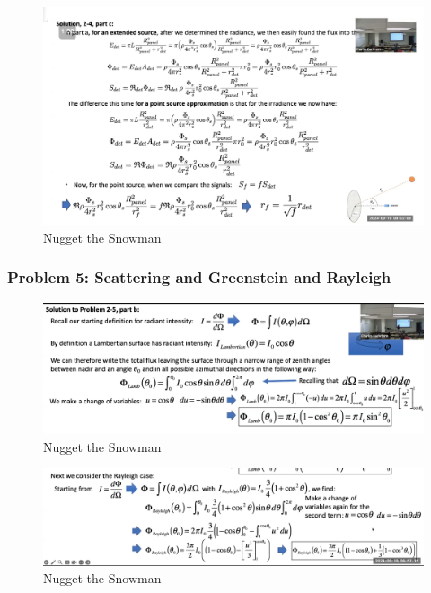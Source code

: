 \documentclass{article}
\begin{document}
\begin{figure}[h!]
\centering
\includegraphics[scale=.6]{Radiometry/Week4/Notes/PSET2/P4/P4aa.png}
\caption{Nugget the Snowman}
\label{fig:P4}
\end{figure}


\clearpage
\subsubsection{Problem 5: Scattering and Greenstein and Rayleigh}
\begin{figure}[h!]
\centering
\includegraphics[scale=.2]{Radiometry/Week4/Notes/PSET2/P5/Num1.png}
\caption{Nugget the Snowman}
\label{fig:Greenstein}
\end{figure}

\begin{figure}[h!]
\centering
\includegraphics[scale=.2]{Radiometry/Week4/Notes/PSET2/P5/Num2.png}
\caption{Nugget the Snowman}
\label{fig:Greenstein}
\end{figure}
\end{document}
